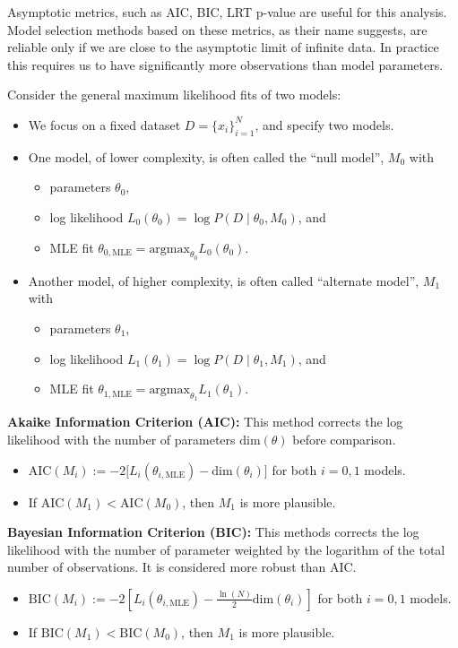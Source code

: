 Asymptotic metrics, such as AIC, BIC, LRT p-value are useful for this analysis. Model selection methods based on these metrics, as their name suggests, are reliable only if we are close to the asymptotic limit of infinite data. In practice this requires us to have significantly more observations than model parameters.

Consider the general maximum likelihood fits of two models:
\begin{itemize}
	\item We focus on a fixed dataset $D = \{x_i\}_{i=1}^N$, and specify two models.
	\item One model, of lower complexity, is often called the ``null model'', $M_0$ with 
	\begin{itemize}
		\item parameters $\theta_0$,
		\item log likelihood $L_0(\theta_0) = \log P(D\;|\;\theta_0, M_0)$, and
		\item MLE fit $\theta_{0, \text{MLE}} = \text{argmax}_{\theta_0} L_0(\theta_0)$.
	\end{itemize}
	\item Another model, of higher complexity, is often called ``alternate model'', $M_1$ with 
	\begin{itemize}
		\item parameters $\theta_1$,
		\item log likelihood $L_1(\theta_1) = \log P(D\;|\;\theta_1, M_1)$, and
		\item MLE fit $\theta_{1, \text{MLE}} = \text{argmax}_{\theta_1} L_1(\theta_1)$.
	\end{itemize}
\end{itemize}
{\bf Akaike Information Criterion (AIC):} This method corrects the log likelihood with the number of parameters $\text{dim}(\theta)$ before comparison.
\begin{itemize}
	\item $\text{AIC}(M_i) := -2\Big[L_i(\theta_{i,\text{MLE}}) - \text{dim}(\theta_i)\Big]$ for both $i=0, 1$ models.
	\item If $\text{AIC}(M_1) < \text{AIC}(M_0)$, then $M_1$  is more plausible.
\end{itemize}
{\bf Bayesian Information Criterion (BIC):} This methods corrects the log likelihood with the number of parameter weighted by the logarithm of the total number of observations. It is considered more robust than AIC.
\begin{itemize}
	\item $\text{BIC}(M_i) := -2\left[L_i(\theta_{i,\text{MLE}}) - \frac{\ln(N)}{2}\text{dim}(\theta_i)\right]$ for both $i=0, 1$ models.
	\item If $\text{BIC}(M_1) < \text{BIC}(M_0)$, then $M_1$  is more plausible.
\end{itemize}
